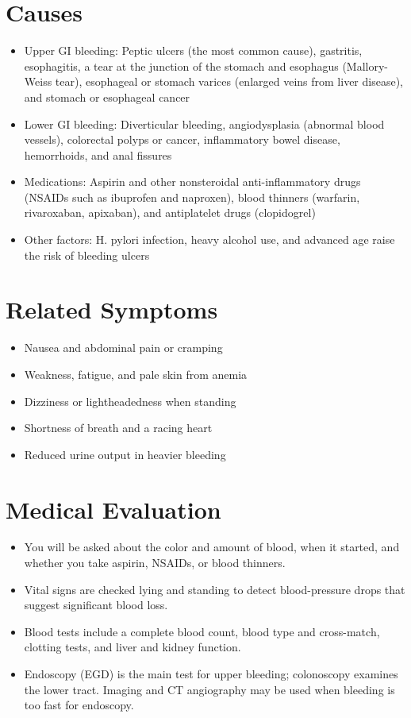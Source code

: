 \section*{Causes}
\begin{itemize}
  \item Upper GI bleeding: Peptic ulcers (the most common cause), gastritis, esophagitis, a tear at the junction of the stomach and esophagus (Mallory-Weiss tear), esophageal or stomach varices (enlarged veins from liver disease), and stomach or esophageal cancer
  \item Lower GI bleeding: Diverticular bleeding, angiodysplasia (abnormal blood vessels), colorectal polyps or cancer, inflammatory bowel disease, hemorrhoids, and anal fissures
  \item Medications: Aspirin and other nonsteroidal anti-inflammatory drugs (NSAIDs such as ibuprofen and naproxen), blood thinners (warfarin, rivaroxaban, apixaban), and antiplatelet drugs (clopidogrel)
  \item Other factors: H. pylori infection, heavy alcohol use, and advanced age raise the risk of bleeding ulcers
\end{itemize}

\section*{Related Symptoms}
\begin{itemize}
  \item Nausea and abdominal pain or cramping
  \item Weakness, fatigue, and pale skin from anemia
  \item Dizziness or lightheadedness when standing
  \item Shortness of breath and a racing heart
  \item Reduced urine output in heavier bleeding
\end{itemize}

\section*{Medical Evaluation}
\begin{itemize}
  \item You will be asked about the color and amount of blood, when it started, and whether you take aspirin, NSAIDs, or blood thinners.
  \item Vital signs are checked lying and standing to detect blood-pressure drops that suggest significant blood loss.
  \item Blood tests include a complete blood count, blood type and cross-match, clotting tests, and liver and kidney function.
  \item Endoscopy (EGD) is the main test for upper bleeding; colonoscopy examines the lower tract. Imaging and CT angiography may be used when bleeding is too fast for endoscopy.
\end{itemize}

